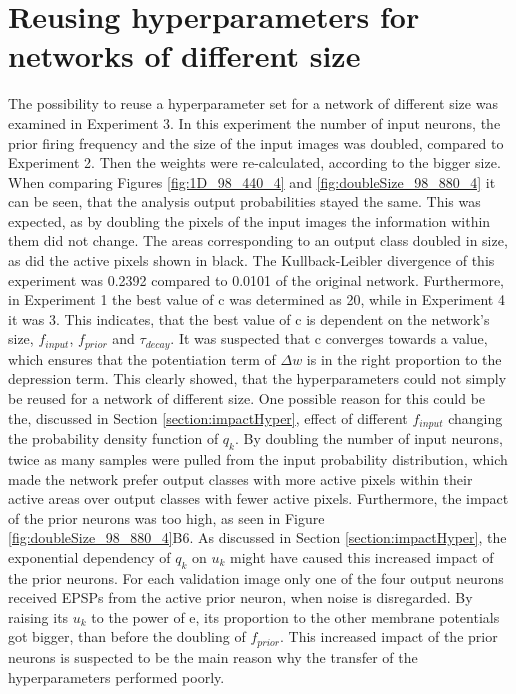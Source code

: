 \section{Reusing hyperparameters for networks of different size}
The possibility to reuse a hyperparameter set for a network of different size was examined in Experiment 3. In this experiment the number of input neurons, the prior firing frequency and the size of the input images was doubled, compared to Experiment 2. Then the weights were re-calculated, according to the bigger size. When comparing Figures \ref{fig:1D_98_440_4} and \ref{fig:doubleSize_98_880_4} it can be seen, that the analysis output probabilities stayed the same. This was expected, as by doubling the pixels of the input images the information within them did not change. The areas corresponding to an output class doubled in size, as did the active pixels shown in black. The Kullback-Leibler divergence of this experiment was 0.2392 compared to 0.0101 of the original network. 
Furthermore, in Experiment 1 the best value of c was determined as 20, while in Experiment 4 it was 3. This indicates, that the best value of c is dependent on the network's size, $f_{input}$, $f_{prior}$ and $\tau_{decay}$. It was suspected that c converges towards a value, which ensures that the potentiation term of $\Delta w$ is in the right proportion to the depression term.
This clearly showed, that the hyperparameters could not simply be reused for a network of different size. One possible reason for this could be the, discussed in Section \ref{section:impactHyper}, effect of different $f_{input}$ changing the probability density function of $q_k$. By doubling the number of input neurons, twice as many samples were pulled from the input probability distribution, which made the network prefer output classes with more active pixels within their active areas over output classes with fewer active pixels. Furthermore, the impact of the prior neurons was too high, as seen in Figure \ref{fig:doubleSize_98_880_4}B6. As discussed in Section \ref{section:impactHyper}, the exponential dependency of $q_k$ on $u_k$ might have caused this increased impact of the prior neurons. For each validation image only one of the four output neurons received EPSPs from the active prior neuron, when noise is disregarded. By raising its $u_k$ to the power of e, its proportion to the other membrane potentials got bigger, than before the doubling of $f_{prior}$. This increased impact of the prior neurons is suspected to be the main reason why the transfer of the hyperparameters performed poorly.

